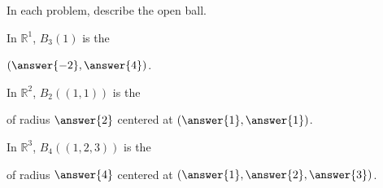 \documentclass{ximera}
\begin{document}
\begin{example}
%  


\end{example}

In each problem, describe the open ball.

\begin{problem}
In $\mathbb{R}^1$, $B_3(1)$ is the \begin{multipleChoice}
\end{multipleChoice}  \begin{problem}$(\answer{-2},\answer{4})$.\end{problem}
\end{problem} 
 
 \begin{problem}
 In $\mathbb{R}^2$, $B_2((1,1))$ is the \begin{multipleChoice}
\end{multipleChoice} \begin{problem}of radius $\answer{2}$ centered at $(\answer{1}, \answer{1})$.\end{problem}
\end{problem}

\begin{problem}
In $\mathbb{R}^3$, $B_4((1,2,3))$ is the \begin{multipleChoice}
\end{multipleChoice} \begin{problem} of radius $\answer{4}$ centered at $(\answer{1}, \answer{2}, \answer{3})$.\end{problem}
\end{problem}
\end{document}
